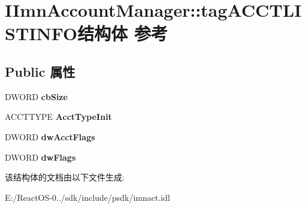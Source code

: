 \hypertarget{struct_i_imn_account_manager_1_1tag_a_c_c_t_l_i_s_t_i_n_f_o}{}\section{I\+Imn\+Account\+Manager\+:\+:tag\+A\+C\+C\+T\+L\+I\+S\+T\+I\+N\+F\+O结构体 参考}
\label{struct_i_imn_account_manager_1_1tag_a_c_c_t_l_i_s_t_i_n_f_o}
\subsection*{Public 属性}
\begin{DoxyCompactItemize}
\item 
\mbox{\label{struct_i_imn_account_manager_1_1tag_a_c_c_t_l_i_s_t_i_n_f_o_a4ce7fcb9ad31f31b8e3c49285e65e87f}} 
D\+W\+O\+RD {\bfseries cb\+Size}
\item 
\mbox{\label{struct_i_imn_account_manager_1_1tag_a_c_c_t_l_i_s_t_i_n_f_o_a177b097800b486d124b6236eb91537e6}} 
A\+C\+C\+T\+T\+Y\+PE {\bfseries Acct\+Type\+Init}
\item 
\mbox{\label{struct_i_imn_account_manager_1_1tag_a_c_c_t_l_i_s_t_i_n_f_o_a4b79df616026a484e3aa29799d718def}} 
D\+W\+O\+RD {\bfseries dw\+Acct\+Flags}
\item 
\mbox{\label{struct_i_imn_account_manager_1_1tag_a_c_c_t_l_i_s_t_i_n_f_o_a6daaeb0d9a6899ffd4224ebdba4df980}} 
D\+W\+O\+RD {\bfseries dw\+Flags}
\end{DoxyCompactItemize}


该结构体的文档由以下文件生成\+:\begin{DoxyCompactItemize}
\item 
E\+:/\+React\+O\+S-\/0../sdk/include/psdk/imnact.\+idl\end{DoxyCompactItemize}
